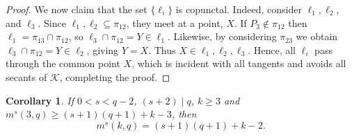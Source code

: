 \documentclass[letterpaper, 12pt]{article}
\newtheorem{corollary}{Corollary}
\newcommand{\K}{\mathcal{K}}
\begin{document}
\begin{proof}
 
	We now claim that the set \( \{\ell_i\} \) is copunctal.  Indeed, consider $\ell_1, \ell_2$, and $\ell_3$.  Since $\ell_1,\ell_2 \subseteq \pi_{12}$, they meet at a point, $X$. If $P_3\notin \pi_{12}$ then $\ell_1=\pi_{13}\cap\pi_{12}$, so $\ell_3\cap \pi_{12}=Y\in \ell_1$.  Likewise, by considering $\pi_{23}$ we obtain $\ell_3\cap \pi_{12}=Y\in \ell_2$, giving $Y=X$.  Thus $X\in \ell_1,\ell_2,\ell_3$. Hence, all \( \ell_i \) pass through the common point \( X \), which is incident with all tangents and avoids all secants of \( \K \), completing the proof.
\end{proof}

\begin{corollary}\label{cor: Barlotti bound on m^s(k,q)}
	If \( 0 < s < q - 2 \), \( (s+2) \mid q \),  $k\ge 3$ and \( m^s(3, q) \ge (s+1)(q+1) +k-3\), then  
	\[
	m^s(k, q) = (s+1)(q+1) + k - 2.
	\]
\end{corollary}
%	
%	
%	
\end{document}
